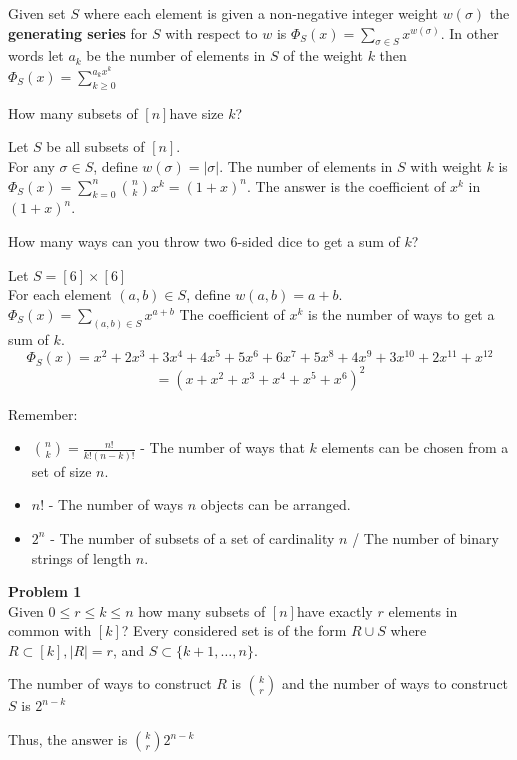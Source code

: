 \documentclass{article}
\newcommand{\setn}{$[n]$}
\newcommand{\oto}[1]{$[#1]$}
\newcommand{\union}{\cup}
\begin{document}
\begin{defn}
	Given set $S$ where each element is given a non-negative integer weight $w(\sigma)$ the \textbf{generating series} for $S$ with respect to $w$ is $\Phi_S(x) = \sum_{\sigma \in S}x^{w(\sigma)}$. In other words let $a_k$ be the number of elements in $S$ of the weight $k$ then $\Phi_S(x)=\sum_{k \ge 0}^{a_kx^k}$
\end{defn}

\example

How many subsets of \setn have size $k$?

Let $S$ be all subsets of \setn.\\
For any $\sigma \in S$, define $w(\sigma) = |\sigma|$. The number of elements in $S$ with weight $k$ is $\Phi_S(x)=\sum_{k=0}^{n}\binom nk x^k = (1+x)^n$. The answer is the coefficient of $x^k$ in $(1+x)^n$.

\example

How many ways can you throw two 6-sided dice to get a sum of $k$?

Let $S = [6] \times [6]$\\
For each element $(a,b) \in S$, define $w(a,b) = a+b$.\\
$\Phi_S(x)=\sum_{(a,b) \in S}x^{a+b}$ The coefficient of $x^k$ is the number of ways to get a sum of $k$.
$$\Phi_S(x) = x^2 + 2x^3 + 3x^4 + 4x^5 + 5x^6 + 6x^7 + 5x^8 + 4x^9 + 3x^10 + 2x^11 + x^12$$
$$= (x + x^2 + x^3 + x^4 + x^5 + x^6)^2$$

Remember:
\begin{itemize}
	\item $\binom nk = \frac{n!}{k!(n-k)!}$ - The number of ways that $k$ elements can be chosen from a set of size $n$.
	\item $n!$ - The number of ways $n$ objects can be arranged.
	\item $2^n$ - The number of subsets of a set of cardinality $n$ / The number of binary strings of length $n$.
\end{itemize} 

\textbf{Problem 1}\\
Given $0 \le r \le k \le n$ how many subsets of \setn have exactly $r$ elements in common with \oto{k}? Every considered set is of the form $R \union S$ where $R \subset [k], |R| = r$, and $S \subset \{k+1, \dots , n\}$.

The number of ways to construct $R$ is $\binom kr$ and the number of ways to construct $S$ is $2^{n-k}$

Thus, the answer is $\binom kr 2^{n-k}$
\end{document}

